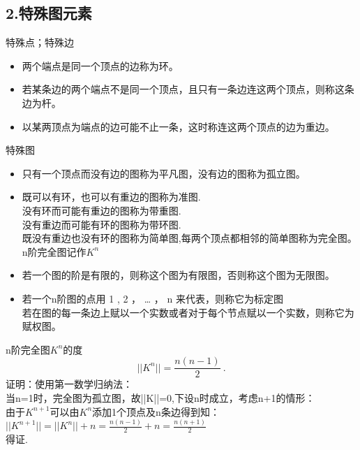 \subsection{2.特殊图元素}
\begin{definition}{特殊点；特殊边}
\begin{itemize}
\item 两个端点是同一个顶点的边称为环。
\item 若某条边的两个端点不是同一个顶点，且只有一条边连这两个顶点，则称这条边为杆。
\item 以某两顶点为端点的边可能不止一条，这时称连这两个顶点的边为重边。
\end{itemize}
\end{definition}
\begin{definition}{特殊图}
\begin{itemize}
\item 只有一个顶点而没有边的图称为平凡图，没有边的图称为孤立图。
\item 既可以有环，也可以有重边的图称为准图.
\\没有环而可能有重边的图称为带重图.
\\没有重边而可能有环的图称为带环图.
\\既没有重边也没有环的图称为简单图,每两个顶点都相邻的简单图称为完全图。n阶完全图记作$K^{n}$
\item 若一个图的阶是有限的，则称这个图为有限图，否则称这个图为无限图。
\item 若一个n阶图的点用 1 , 2 ， … ， n 来代表，则称它为标定图
\\若在图的每一条边上赋以一个实数或者对于每个节点赋以一个实数，则称它为赋权图。
\end{itemize}
\end{definition}
\begin{theorem}{n阶完全图$K^{n}$的度}
\begin{equation}
||K^{n}||=\frac{n(n-1)}{2}~.
\end{equation}
证明：使用第一数学归纳法：
\\当n=1时，完全图为孤立图，故||K||=0,下设n时成立，考虑n+1的情形：
\\由于$K^{n+1}$可以由$K^{n}$添加1个顶点及n条边得到知：
\\ $||K^{n+1}||=||K^{n}||+n=\frac{n(n-1)}{2}+n=\frac{n(n+1)}{2}$
\\得证.
\end{theorem}
